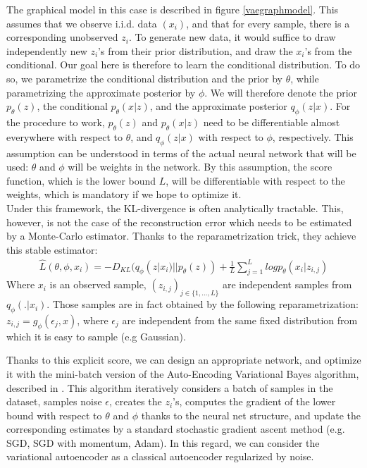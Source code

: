 \documentclass[letterpaper, twoside]{article}
\begin{document}
    The graphical model in this case is described in figure \ref{vaegraphmodel}. This assumes that we observe i.i.d. data $(x_i)$, and that for every sample, there is a corresponding unobserved $z_i$. To generate new data, it would suffice to draw independently new $z_i$'s from their prior distribution, and draw the $x_i$'s from the conditional. Our goal here is therefore to learn the conditional distribution. To do so, we parametrize the conditional distribution and the prior by $\theta$, while parametrizing the approximate posterior by $\phi$. We will therefore denote the prior $p_\theta(z)$, the conditional $p_\theta(x|z)$, and the approximate posterior $q_\phi(z|x)$. For the procedure to work, $p_\theta(z)$ and $p_\theta(x|z)$ need to be differentiable almost everywhere with respect to $\theta$, and $q_\phi(z|x)$ with respect to $\phi$, respectively. This assumption can be understood in terms of the actual neural network that will be used: $\theta$ and $\phi$ will be weights in the network. By this assumption, the score function, which is the lower bound $L$, will be differentiable with respect to the weights, which is mandatory if we hope to optimize it.\\

    Under this framework, the KL-divergence is often analytically tractable. This, however, is not the case of the reconstruction error which needs to be estimated by a Monte-Carlo estimator. Thanks to the reparametrization trick, they achieve this stable estimator:\\
    \begin{align}
    \hat L(\theta, \phi, x_i) = -D_{KL}(q_\phi(z|x_i)||p_\theta(z)) + \frac{1}{L} \sum_{j=1}^L log p_\theta(x_i | z_{i, j})
    \end{align}
    Where $x_i$ is an observed sample, $(z_{i, j})_{j\in \{1, ..., L\}}$ are independent samples from $q_\phi(.|x_i)$. Those samples are in fact obtained by the following reparametrization: $z_{i, j}= g_\phi(\epsilon_j, x)$, where $\epsilon_j$ are independent from the same fixed distribution from which it is easy to sample (e.g Gaussian).

    Thanks to this explicit score, we can design an appropriate network, and optimize it with the mini-batch version of the Auto-Encoding Variational Bayes algorithm, described in \cite{Kingma.aevb}. This algorithm iteratively considers a batch of samples in the dataset, samples noise $\epsilon$, creates the $z_i$'s, computes the gradient of the lower bound with respect to $\theta$ and $\phi$ thanks to the neural net structure, and update the corresponding estimates by a standard stochastic gradient ascent method (e.g. SGD, SGD with momentum, Adam). In this regard, we can consider the variational autoencoder as a classical autoencoder regularized by noise. \\
\end{document}
